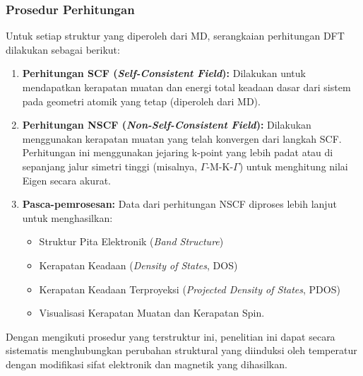 \subsubsection{Prosedur Perhitungan}
Untuk setiap struktur yang diperoleh dari MD, serangkaian perhitungan DFT dilakukan sebagai berikut:
\begin{enumerate}
    \item \textbf{Perhitungan SCF (\textit{Self-Consistent Field}):} Dilakukan untuk mendapatkan kerapatan muatan dan energi total keadaan dasar dari sistem pada geometri atomik yang tetap (diperoleh dari MD).
    \item \textbf{Perhitungan NSCF (\textit{Non-Self-Consistent Field}):} Dilakukan menggunakan kerapatan muatan yang telah konvergen dari langkah SCF. Perhitungan ini menggunakan jejaring k-point yang lebih padat atau di sepanjang jalur simetri tinggi (misalnya, $\Gamma$-M-K-$\Gamma$) untuk menghitung nilai Eigen secara akurat.
    \item \textbf{Pasca-pemrosesan:} Data dari perhitungan NSCF diproses lebih lanjut untuk menghasilkan:
    \begin{itemize}
        \item Struktur Pita Elektronik (\textit{Band Structure})
        \item Kerapatan Keadaan (\textit{Density of States}, DOS)
        \item Kerapatan Keadaan Terproyeksi (\textit{Projected Density of States}, PDOS)
        \item Visualisasi Kerapatan Muatan dan Kerapatan Spin.
    \end{itemize}
\end{enumerate}
Dengan mengikuti prosedur yang terstruktur ini, penelitian ini dapat secara sistematis menghubungkan perubahan struktural yang diinduksi oleh temperatur dengan modifikasi sifat elektronik dan magnetik yang dihasilkan.